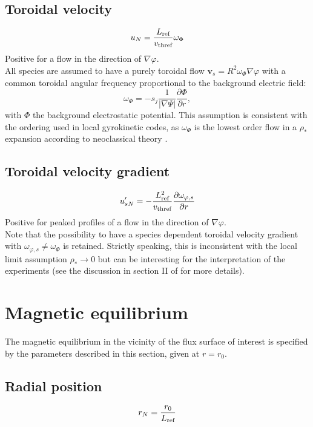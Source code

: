 \documentclass[fleqn]{report}
\begin{document}
\subsection{Toroidal velocity}
$$u_{N}=\frac{L_{\textrm{ref}}}{v_\textrm{thref}}\omega_{\Phi}$$
Positive for a flow in the direction of $\nabla \varphi$.\\
All species are assumed to have a purely toroidal flow $\mathbf{v}_s=R^2\omega_\Phi\nabla \varphi$ with a common toroidal angular frequency proportional to the background electric field:
$$\omega_{\Phi}=-s_j\frac{1}{|\nabla \Psi|}\frac{\partial \Phi}{\partial r},$$
with $\Phi$ the background electrostatic potential. This assumption is consistent with the ordering used in local gyrokinetic codes, as $\omega_\Phi$ is the lowest order flow in a $\rho_*$ expansion according to neoclassical theory \cite{Hirshman:NF1981}.

\subsection{Toroidal velocity gradient}
$$u'_{sN}=-\frac{L_{\textrm{ref}}^2}{v_\textrm{thref}}\frac{\partial \omega_{\varphi,s}}{\partial r}$$
Positive for peaked profiles of a flow in the direction of $\nabla \varphi$.\\
Note that the possibility to have a species dependent toroidal velocity gradient with $\omega_{\varphi,s}\neq \omega_\Phi$ is retained. Strictly speaking, this is inconsistent with the local limit assumption $\rho_*\rightarrow 0$ but can be interesting for the interpretation of the experiments (see the discussion in section II of \cite{Camenen:PoP2016} for more details).



\section{Magnetic equilibrium}
The magnetic equilibrium in the vicinity of the flux surface of interest is specified by the parameters described in this section, given at $r=r_0$.

\subsection{Radial position}
$$r_N=\frac{r_0}{L_{\textrm{ref}}}$$
\end{document}
